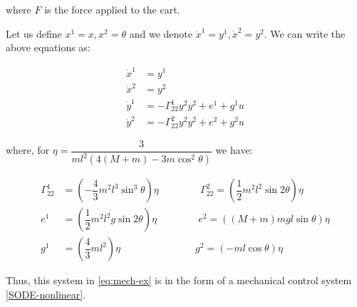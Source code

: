 where $F$ is the force applied to the cart.

Let us define $x^1 = x, x^2 = \theta$ and we denote $\dot{x}^1 = y^1, \dot{x}^2 = y^2$. We can write the above equations as:

\begin{equation}
    \label{eq:mech-ex}
    \begin{split}
        \dot{x}^1 &= y^1 \\
        \dot{x}^2 &= y^2 \\
        \dot{y}^1 &= -\Gamma_{22}^1 y^2 y^2 + e^1 + g^1 u \\
        \dot{y}^2 &= -\Gamma_{22}^2 y^2 y^2 + e^2 + g^2 u
    \end{split}
\end{equation}

where, for $\eta = \dfrac{3}{ml^2 \left(4(M + m) - 3m \cos^2{\theta} \right)}$ we have:

\begin{equation*}
    \begin{split}
        \Gamma_{22}^1 &= \left(-\dfrac{4}{3} m^2 l^3 \sin^3{\theta}\right)\eta \hspace{50pt} \Gamma_{22}^2 = \left(\dfrac{1}{2} m^2 l^2 \sin{2\theta}\right) \eta \\
        e^1 &= \left(\dfrac{1}{2} m^2 l^2 g \sin{2\theta}\right) \eta \hspace{50pt} e^2 = \left( (M + m) mgl \sin{\theta} \right) \eta \\
        g^1 &= \left(\dfrac{4}{3} ml^2 \right) \eta \hspace{90pt} g^2 = \left( - ml \cos{\theta} \right) \eta 
    \end{split}
\end{equation*}

Thus, this system in \eqref{eq:mech-ex} is in the form of a mechanical control system \eqref{SODE-nonlinear}.